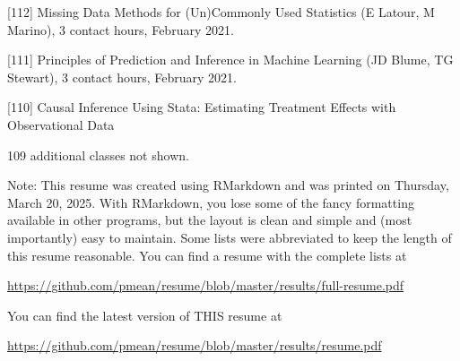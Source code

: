 \documentclass[
  12pt,
]{article}
\begin{document}
{[}112{]} Missing Data Methods for (Un)Commonly Used Statistics (E
Latour, M Marino), 3 contact hours, February 2021.

{[}111{]} Principles of Prediction and Inference in Machine Learning (JD
Blume, TG Stewart), 3 contact hours, February 2021.

{[}110{]} Causal Inference Using Stata: Estimating Treatment Effects
with Observational Data

109 additional classes not shown.

Note: This resume was created using RMarkdown and was printed on
Thursday, March 20, 2025. With RMarkdown, you lose some of the fancy
formatting available in other programs, but the layout is clean and
simple and (most importantly) easy to maintain. Some lists were
abbreviated to keep the length of this resume reasonable. You can find a
resume with the complete lists at

\url{https://github.com/pmean/resume/blob/master/results/full-resume.pdf}

You can find the latest version of THIS resume at

\url{https://github.com/pmean/resume/blob/master/results/resume.pdf}
\end{document}
